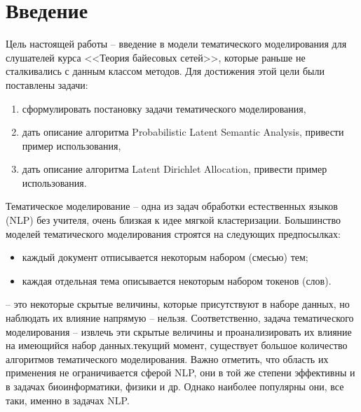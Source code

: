 \documentclass[aps,%
12pt,%
final,%
oneside,
onecolumn,%
musixtex, %
superscriptaddress,%
centertags]{article} %
\begin{document}
\tableofcontents
\setcounter{page}{3}

\newpage
\section*{Введение}
\hspace{0.4cm}
Цель настоящей работы – введение в модели тематического моделирования для слушателей курса <<Теория байесовых сетей>>, которые раньше не сталкивались с данным классом методов. Для достижения этой цели были поставлены задачи:
\begin{enumerate}
  \item сформулировать постановку задачи тематического моделирования,
  \item дать описание алгоритма Probabilistic Latent Semantic Analysis, привести пример использования,
  \item дать описание алгоритма Latent Dirichlet Allocation, привести пример использования.
\end{enumerate}
Тематическое моделирование – одна из задач обработки естественных языков (NLP) без учителя, очень близкая к идее мягкой кластеризации. Большинство моделей тематического моделирования строятся на следующих предпосылках:
\begin{itemize}
\item каждый документ отписывается некоторым набором (смесью) тем;
\item каждая отдельная тема описывается некоторым набором токенов (слов).
\end{itemize}
 – это некоторые скрытые величины, которые присутствуют в наборе данных, но наблюдать их влияние напрямую – нельзя. Соответственно, задача тематического моделирования – извлечь эти скрытые величины и проанализировать их влияние на имеющийся набор данных. текущий момент, существует большое количество алгоритмов тематического моделирования. Важно отметить, что область их применения не ограничивается сферой NLP, они в той же степени эффективны и в задачах биоинформатики, физики и др. Однако наиболее популярны они, все таки, именно в задачах NLP.

\newpage
\end{document}
